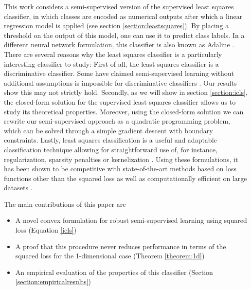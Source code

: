 \documentclass{llncs}
\begin{document}
This work considers a semi-supervised version of the supervised least squares classifier, in which classes are encoded as numerical outputs after which a linear regression model is applied (see section \ref{section:leastsquares}). By placing a threshold on the output of this model, one can use it to predict class labels. 
In a different neural network formulation, this classifier is also known as Adaline \cite{Widrow1960}.
There are several reasons why the least squares classifier is a particularly interesting classifier to study: 
First of all, the least squares classifier is a discriminative classifier. 
Some have claimed semi-supervised learning without additional assumptions is impossible for discriminative classifiers \cite{Seeger2001,Singh2008}. 
Our results show this may not strictly hold. 
Secondly, as we will show in section \ref{section:icls}, the closed-form solution for the supervised least squares classifier allows us to study its theoretical properties.
Moreover, using the closed-form solution we can rewrite our semi-supervised approach as a quadratic programming problem, which can be solved through a simple gradient descent with boundary constraints. 
Lastly, least squares classification is a useful and adaptable classification technique  allowing for straightforward use of, for instance, regularization, sparsity penalties or kernelization \cite{Hastie2001,Rifkin2003,Poggio2003,Tibshirani1996}. 
Using these formulations, it has been shown to be competitive with state-of-the-art methods based on loss functions other than the squared loss \cite{Rifkin2003} as well as computationally efficient on large datasets \cite{Bottou2010}.


The main contributions of this paper are
\begin{itemize}
  \item A novel convex formulation for robust semi-supervised learning using squared loss (Equation \eqref{icls})
  \item A proof that this procedure never reduces performance in terms of the squared loss for the 1-dimensional case (Theorem \ref{theorem:1d})
  \item An empirical evaluation of the properties of this classifier (Section \ref{section:empiricalresults})
\end{itemize}
\end{document}
